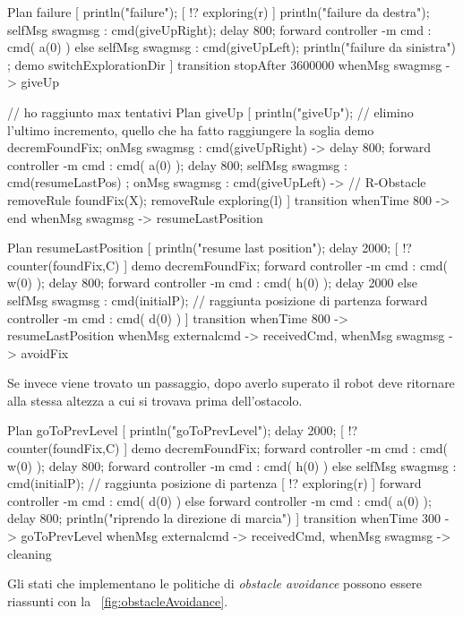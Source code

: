 \documentclass{../llncs}
\newcommand{\xf}[1]{\figurename~\ref{fig:#1}}
\begin{document}
\begin{qacode}[caption={SoftwareAgent, pt8}]
Plan failure [
	println("failure");
	[ !? exploring(r) ] {
		println("failure da destra");
		selfMsg swagmsg : cmd(giveUpRight);
		delay 800;
		forward controller -m cmd : cmd( a(0) )
	}
	else {
		selfMsg swagmsg : cmd(giveUpLeft);
		println("failure da sinistra")
	};
	demo switchExplorationDir
]
transition stopAfter 3600000
	whenMsg swagmsg -> giveUp

// ho raggiunto max tentativi
Plan giveUp [
	println("giveUp");
	// elimino l'ultimo incremento, quello che ha fatto raggiungere la soglia
	demo decremFoundFix;
	onMsg swagmsg : cmd(giveUpRight) -> {
		delay 800;
		forward controller -m cmd : cmd( a(0) );
		delay 800;
		selfMsg swagmsg : cmd(resumeLastPos)
	};
	onMsg swagmsg : cmd(giveUpLeft) -> { // R-Obstacle
		removeRule foundFix(X);
		removeRule exploring(l)
	}
]
transition
	whenTime 800 -> end
	whenMsg swagmsg -> resumeLastPosition
	
Plan resumeLastPosition [
	println("resume last position");
	delay 2000;
	[ !? counter(foundFix,C) ] {
		demo decremFoundFix;
		forward controller -m cmd : cmd( w(0) );
		delay 800;
		forward controller -m cmd : cmd( h(0) );
		delay 2000
	}
	else {
		selfMsg swagmsg : cmd(initialP); // raggiunta posizione di partenza
		forward controller -m cmd : cmd( d(0) )
	}
]
transition
	whenTime 800 -> resumeLastPosition
	whenMsg externalcmd -> receivedCmd,
	whenMsg swagmsg -> avoidFix
\end{qacode}

Se invece viene trovato un passaggio, dopo averlo superato il robot deve ritornare alla stessa altezza a cui si trovava prima dell'ostacolo.\\

\begin{qacode}[caption={SoftwareAgent, pt9}]
Plan goToPrevLevel [
	println("goToPrevLevel");
	delay 2000;
	[ !? counter(foundFix,C) ] {
		demo decremFoundFix;
		forward controller -m cmd : cmd( w(0) );
		delay 800;
		forward controller -m cmd : cmd( h(0) )
	}
	else {
		selfMsg swagmsg : cmd(initialP); // raggiunta posizione di partenza
		[ !? exploring(r) ] forward controller -m cmd : cmd( d(0) )
		else forward controller -m cmd : cmd( a(0) );
		delay 800;
		println("riprendo la direzione di marcia")
	}
]
transition
	whenTime 300 -> goToPrevLevel
	whenMsg externalcmd -> receivedCmd,
	whenMsg swagmsg -> cleaning
\end{qacode}

Gli stati che implementano le politiche di \emph{obstacle avoidance} possono essere riassunti con la \xf{obstacleAvoidance}.
\end{document}
